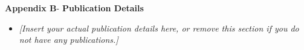 \begin{center}
	{\Large \textbf{Appendix B}}-\vspace*{0.5 cm}
	{\Large \textbf{Publication Details}}
\end{center}
\begin{center}
	\begin{itemize}
		\item \textit{[Insert your actual publication details here, or remove this section if you do not have any publications.]}
	\end{itemize}
\end{center}

